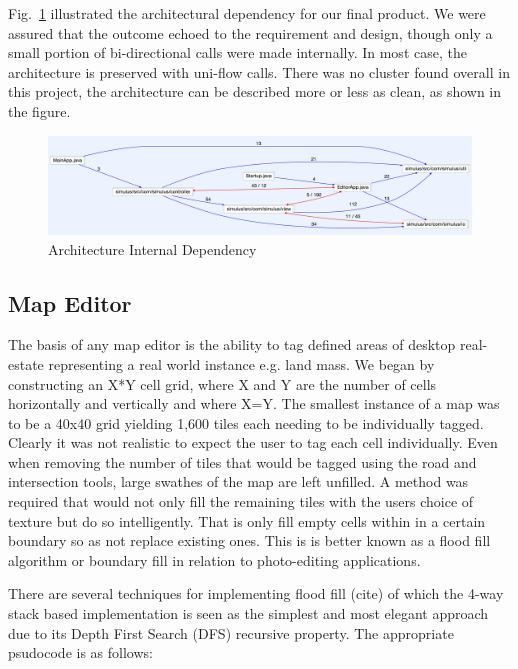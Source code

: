 Fig.~\ref{fig:archIntDependency} illustrated the architectural dependency for our final product. We were assured that the outcome echoed to the requirement and design, though only a small portion of bi-directional calls were made internally. In most case, the architecture is preserved with uni-flow calls. There was no cluster found overall in this project, the architecture can be described more or less as clean, as shown in the figure. 

\begin{figure}[h]
	\begin{center}
			\includegraphics[width=\textwidth]{img/archIntDependency.png}
		\caption{Architecture Internal Dependency}
		\label{fig:archIntDependency}
	\end{center}
\end{figure}

\subsection{Map Editor}

The basis of any map editor is the ability to tag defined areas of desktop real-estate representing a real world instance e.g. land mass. We began by constructing an X*Y cell grid, where X and Y are the number of cells horizontally and vertically and where X=Y. The smallest instance of a map was to be a 40x40 grid yielding 1,600 tiles each needing to be individually tagged. Clearly it was not realistic to expect the user to tag each cell individually. Even when removing the number of tiles that would be tagged using the road and intersection tools, large swathes of the map are left unfilled.  
A method was required that would not only fill the remaining tiles with the users choice of texture but do so intelligently. That is only fill empty cells within in a certain boundary so as not replace existing ones.  This is is better known as a flood fill algorithm or boundary fill in relation to photo-editing applications.

There are several techniques for implementing flood fill (cite) of which the 4-way stack based implementation is seen as the simplest and most elegant approach due to its Depth First Search (DFS) recursive property.  The appropriate psudocode is as follows:

